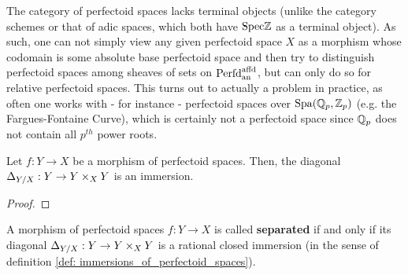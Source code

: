             \begin{remark}
                The category of perfectoid spaces lacks terminal objects (unlike the category schemes or that of adic spaces, which both have $\mathrm{Spec} \mathbb{Z}$ as a terminal object). As such, one can not simply view any given perfectoid space $X$ as a morphism whose codomain is some absolute base perfectoid space and then try to distinguish perfectoid spaces among sheaves of sets on $\mathrm{Perfd}^{\mathrm{affd}}_{\mathrm{an}}$, but can only do so for relative perfectoid spaces. This turns out to actually a problem in practice, as often one works with - for instance - perfectoid spaces over $\mathrm{Spa}(\mathbb{Q}_p, \mathbb{Z}_p)$ (e.g. the Fargues-Fontaine Curve), which is certainly not a perfectoid space since $\mathbb{Q}_p$ does not contain all $p^{th}$ power roots.
            \end{remark}
            \begin{proposition} \label{prop: diagonals_of_perfectoid_spaces_are_immersions} 
                Let $f: Y \to X$ be a morphism of perfectoid spaces. Then, the diagonal $\Delta_{Y/X}: Y \to Y \x_X Y$ is an immersion.
            \end{proposition}
                \begin{proof}
                    
                \end{proof}
            \begin{definition} \label{def: separated_perfectoid_spaces}
                A morphism of perfectoid spaces $f: Y \to X$ is called \textbf{separated} if and only if its diagonal $\Delta_{Y/X}: Y \to Y \x_X Y$ is a rational closed immersion (in the sense of definition \ref{def: immersions_of_perfectoid_spaces}).
            \end{definition}
